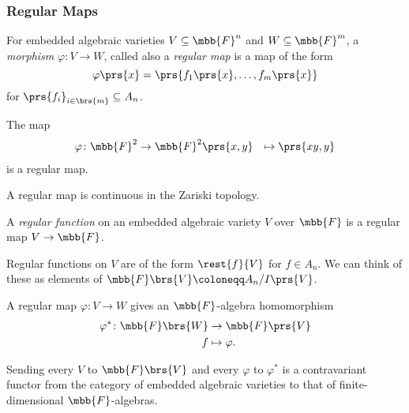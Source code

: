 \documentclass[10pt,a4paper,twoside,openany,hidelinks]{book}
\begin{document}
\subsubsection{Regular Maps}

\begin{definition}
For embedded algebraic varieties $V \subseteq \mbb{F}^n$ and $W \subseteq \mbb{F}^m$, a \emph{morphism} $\varphi \colon V \to W$, called also a \emph{regular map} is a map of the form
\[\varphi\prs{x} = \prs{f_1\prs{x}, \ldots, f_m\prs{x}}\]
for $\prs{f_i}_{i \in \brs{m}} \subseteq A_n$.
\end{definition}

\begin{example}
The map
\begin{align*}
\varphi \colon \mbb{F}^2 &\to \mbb{F}^2
\prs{x,y} &\mapsto \prs{xy,y} 
\end{align*}
is a regular map.
\end{example}

\begin{exercise}
A regular map is continuous in the Zariski topology.
\end{exercise}

\begin{definition}
A \emph{regular function} on an embedded algebraic variety $V$ over $\mbb{F}$ is a regular map $V \to \mbb{F}$.
\end{definition}

\begin{remark}
Regular functions on $V$ are of the form $\rest{f}{V}$ for $f \in A_n$. We can think of these as elements of $\mbb{F}\brs{V} \coloneqq A_n / I\prs{V}$.
\end{remark}

\begin{definition}
A regular map $\varphi \colon V \to W$ gives an $\mbb{F}$-algebra homomorphism
\begin{align*}
\varphi^* \colon \mbb{F}\brs{W} &\to \mbb{F}\prs{V} \\
f &\mapsto \varphi \text{.}
\end{align*}
\end{definition}

\begin{remark}
Sending every $V$ to $\mbb{F}\brs{V}$ and every $\varphi$ to $\varphi^*$ is a contravariant functor from the category of embedded algebraic varieties to that of finite-dimensional $\mbb{F}$-algebras.
\end{remark}
\end{document}
